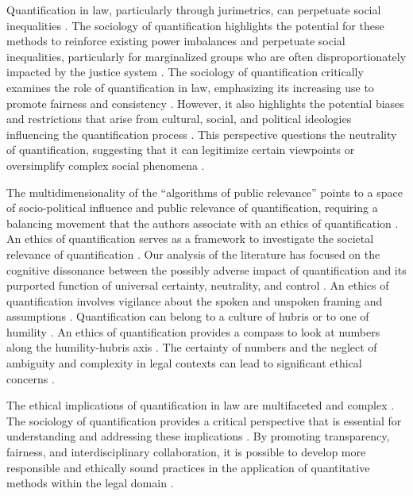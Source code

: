 Quantification in law, particularly through jurimetrics, can perpetuate social inequalities \cite{10.1590/dados.2022.65.3.267,10.32586/rcda.v18i1.585}. The sociology of quantification highlights the potential for these methods to reinforce existing power imbalances and perpetuate social inequalities, particularly for marginalized groups who are often disproportionately impacted by the justice system \cite{10.1590/dados.2022.65.3.267,10.32586/rcda.v18i1.585}. The sociology of quantification critically examines the role of quantification in law, emphasizing its increasing use to promote fairness and consistency \cite{10.1057/s41599-020-00557-0,10.1177/09596801221075807}. However, it also highlights the potential biases and restrictions that arise from cultural, social, and political ideologies influencing the quantification process \cite{10.1057/s41599-020-00557-0,10.1177/09596801221075807}. This perspective questions the neutrality of quantification, suggesting that it can legitimize certain viewpoints or oversimplify complex social phenomena \cite{10.1111/ilr.12067,10.20396/rdbci.v18i0.8658889}.

The multidimensionality of the “algorithms of public relevance” points to a space of socio-political influence and public relevance of quantification, requiring a balancing movement that the authors associate with an ethics of quantification \cite{gillespie2014}. An ethics of quantification serves as a framework to investigate the societal relevance of quantification \cite{gillespie2014}. Our analysis of the literature has focused on the cognitive dissonance between the possibly adverse impact of quantification and its purported function of universal certainty, neutrality, and control \cite{10.1057/s41599-020-00557-0}. An ethics of quantification involves vigilance about the spoken and unspoken framing and assumptions \cite{10.1057/s41599-020-00557-0}. Quantification can belong to a culture of hubris or to one of humility \cite{jasanoff2003}. An ethics of quantification provides a compass to look at numbers along the humility-hubris axis \cite{jasanoff2003}. The certainty of numbers and the neglect of ambiguity and complexity in legal contexts can lead to significant ethical concerns \cite{10.1057/s41599-020-00557-0}.

The ethical implications of quantification in law are multifaceted and complex \cite{10.1057/s41599-020-00557-0}. The sociology of quantification provides a critical perspective that is essential for understanding and addressing these implications \cite{10.1057/s41599-020-00557-0}. By promoting transparency, fairness, and interdisciplinary collaboration, it is possible to develop more responsible and ethically sound practices in the application of quantitative methods within the legal domain \cite{10.1057/s41599-020-00557-0}.


